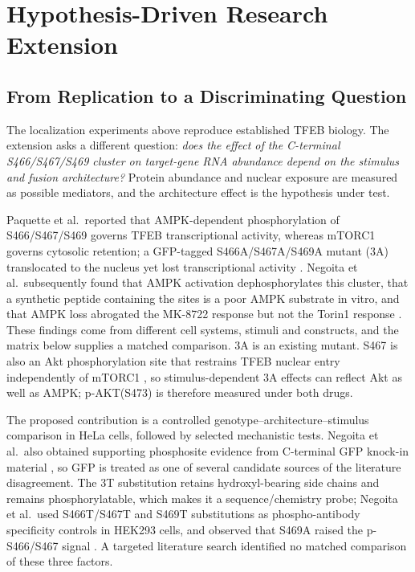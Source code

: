 \section{Hypothesis-Driven Research Extension}\label{sec:extension}
\subsection{From Replication to a Discriminating Question}
The localization experiments above reproduce established TFEB biology. The extension asks a different question: \textit{does the effect of the C-terminal S466/S467/S469 cluster on target-gene RNA abundance depend on the stimulus and fusion architecture?} Protein abundance and nuclear exposure are measured as possible mediators, and the architecture effect is the hypothesis under test.

Paquette et al.\ reported that AMPK-dependent phosphorylation of S466/\allowbreak S467/\allowbreak S469 governs TFEB transcriptional activity, whereas mTORC1 governs cytosolic retention; a GFP-tagged S466A/\allowbreak S467A/\allowbreak S469A mutant (3A) translocated to the nucleus yet lost transcriptional activity \cite{Paquette2021,Negoita2026}. Negoita et al.\ subsequently found that AMPK activation dephosphorylates this cluster, that a synthetic peptide containing the sites is a poor AMPK substrate in vitro, and that AMPK loss abrogated the MK-8722 response but not the Torin1 response \cite{Negoita2026}. These findings come from different cell systems, stimuli and constructs, and the matrix below supplies a matched comparison. 3A is an existing mutant. S467 is also an Akt phosphorylation site that restrains TFEB nuclear entry independently of mTORC1 \cite{Palmieri2017}, so stimulus-dependent 3A effects can reflect Akt as well as AMPK; p-AKT(S473) is therefore measured under both drugs.

The proposed contribution is a controlled genotype--architecture--stimulus comparison in HeLa cells, followed by selected mechanistic tests. Negoita et al.\ also obtained supporting phosphosite evidence from C-terminal GFP knock-in material \cite{Negoita2026}, so GFP is treated as one of several candidate sources of the literature disagreement. The 3T substitution retains hydroxyl-bearing side chains and remains phosphorylatable, which makes it a sequence/chemistry probe; Negoita et al.\ used S466T/S467T and S469T substitutions as phospho-antibody specificity controls in HEK293 cells, and observed that S469A raised the p-S466/S467 signal \cite{Negoita2026}. A targeted literature search identified no matched comparison of these three factors.

